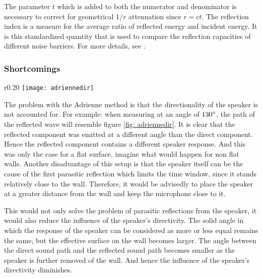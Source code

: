 The parameter $t$ which is added to both the numerator and denominator is necessary to correct for geometrical $1/r$ attenuation since $r =c t$. 
The reflection index is a measure for the average ratio of reflected energy and incident energy. It is this standardized quantity that is used to compare the reflection capacities of different noise barriers. For more details, see \cite{Adrienne}.

\subsubsection{Shortcomings}
\begin{wrapfigure}{r}{0.20\textwidth}
	\vspace{-10pt}
  \centering
    \texttt{[image: adriennedir]}
  \caption{Path of the reflected wave.}
  \label{fig: adriennedir}
\end{wrapfigure}
The problem with the Adrienne method is that the directionality of the speaker is not accounted for. For example: when measuring at an angle of $130^{\circ}$, the path of the reflected wave will resemble figure \ref{fig: adriennedir}. It is clear that the reflected component was emitted at a different angle than the direct component. Hence the reflected component contains a different speaker response. And this was only the case for a flat surface, imagine what would happen for non flat walls. Another disadvantage of this setup is that the speaker itself can be the cause of the first parasitic reflection which limits the time window, since it stands relatively close to the wall. Therefore, it would be advisedly to place the speaker at a greater distance from the wall and keep the microphone close to it.

This would not only solve the problem of parasitic reflections from the speaker, it would also reduce the influence of the speaker's directivity. The solid angle in which the response of the speaker can be considered as more or less equal remains the same, but the effective surface on the wall becomes larger. The angle between the direct sound path and the reflected sound path becomes smaller as the speaker is further removed of the wall. And hence the influence of the speaker's directivity diminishes.

